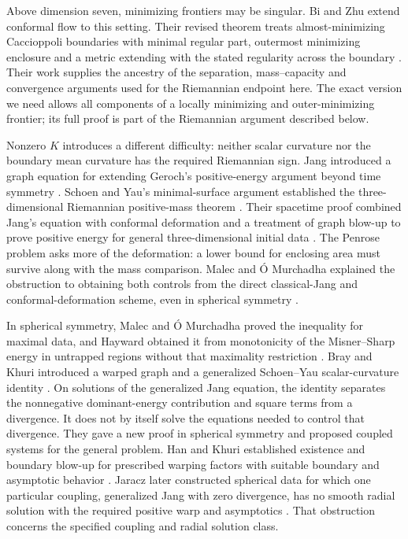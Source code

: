Above dimension seven, minimizing frontiers may be singular. Bi and
Zhu extend conformal flow to this setting. Their revised theorem treats
almost-minimizing Caccioppoli boundaries with minimal regular part,
outermost minimizing enclosure and a metric extending with the stated
regularity across the boundary \cite[Theorem 1.2]{BiZhu2026v2}. Their work
supplies the ancestry of the separation, mass--capacity and convergence
arguments used for the Riemannian endpoint here. The exact version we
need allows all components of a locally minimizing and outer-minimizing
frontier; its full proof is part of the Riemannian argument described
below.

Nonzero $K$ introduces a different difficulty: neither scalar curvature
nor the boundary mean curvature has the required Riemannian sign.
Jang introduced a graph equation for extending Geroch's positive-energy
argument beyond time symmetry \cite{Jang1978}. Schoen and Yau's
minimal-surface argument established the three-dimensional Riemannian
positive-mass theorem \cite{SchoenYau1979}. Their spacetime proof combined
Jang's equation with conformal deformation and a treatment of graph
blow-up to prove positive energy for general three-dimensional initial
data \cite{SchoenYau1981}. The Penrose problem asks more of the deformation:
a lower bound for enclosing area must survive along with the mass
comparison. Malec and \'O Murchadha explained the obstruction to obtaining
both controls from the direct classical-Jang and conformal-deformation
scheme, even in spherical symmetry \cite{Malec}.

In spherical symmetry, Malec and \'O Murchadha proved the inequality
for maximal data, and Hayward obtained it from monotonicity of the
Misner--Sharp energy in untrapped regions without that maximality
restriction \cite{MalecOMurchadha1994,Hayward1996}.
Bray and Khuri introduced a warped graph and a generalized Schoen--Yau
scalar-curvature identity \cite{BrayKhuri2010,BrayKhuri2011}. On solutions
of the generalized Jang equation, the identity separates the
nonnegative dominant-energy contribution and square terms from a
divergence. It does not by itself solve the equations needed to control
that divergence. They gave a new proof in spherical symmetry and
proposed coupled systems for the general problem. Han and Khuri
established existence and boundary blow-up for prescribed warping
factors with suitable boundary and asymptotic behavior \cite{HanKhuri}. Jaracz
later constructed spherical data for which one particular coupling,
generalized Jang with zero divergence, has no smooth radial solution
with the required positive warp and asymptotics \cite{Jaracz2023}. That
obstruction concerns the specified coupling and radial solution class.

